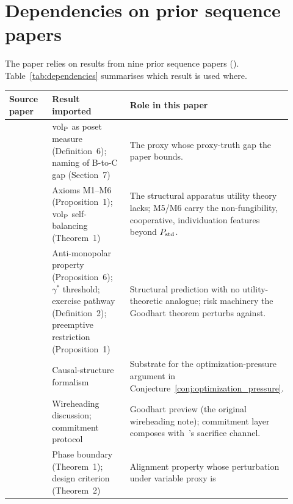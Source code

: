 \section{Dependencies on prior sequence papers}
\label{app:dependencies}

The paper relies on results from nine prior sequence papers
(\citep{lasser2026gfm,lasser2026poset,lasser2026horizon,lasser2026scm,lasser2026exo,lasser2026phase,lasser2026wamura,lasser2026paper8a,lasser2026paper8b}).
Table~\ref{tab:dependencies} summarises which result is used
where.

\begin{table}[ht]
\centering
\footnotesize
\setlength{\tabcolsep}{4pt}
\begin{tabular}{>{\raggedright\arraybackslash}p{0.18\linewidth}
                >{\raggedright\arraybackslash}p{0.32\linewidth}
                >{\raggedright\arraybackslash}p{0.42\linewidth}}
\toprule
\textbf{Source paper} & \textbf{Result imported} &
\textbf{Role in this paper} \\
\midrule
\citep[Foundation]{lasser2026gfm} &
${\operatorname{vol}_{\mathrm{P}}}$ as poset measure (Definition~6); naming of B-to-C gap
(Section~7) &
The proxy whose proxy-truth gap the paper bounds. \\
\addlinespace
\citep[Poset Definition]{lasser2026poset} &
Axioms M1--M6 (Proposition~1); ${\operatorname{vol}_{\mathrm{P}}}$ self-balancing
(Theorem~1) &
The structural apparatus utility theory lacks; M5/M6 carry the
non-fungibility, cooperative, individuation features beyond
$P_{\mathrm{std}}$. \\
\addlinespace
\citep[Horizon Aware]{lasser2026horizon} &
Anti-monopolar property (Proposition~6); $\gamma^*$ threshold;
exercise pathway (Definition~2); preemptive restriction
(Proposition~1) &
Structural prediction with no utility-theoretic analogue;
risk machinery the Goodhart theorem perturbs against. \\
\addlinespace
\citep[SCM]{lasser2026scm} &
Causal-structure formalism &
Substrate for the optimization-pressure argument in
Conjecture~\ref{conj:optimization_pressure}. \\
\addlinespace
\citep[Exogenous Verification]{lasser2026exo} &
Wireheading discussion; commitment protocol &
Goodhart preview (the original wireheading note); commitment
layer composes with~\citep{lasser2026paper8a}'s sacrifice
channel. \\
\addlinespace
\citep[Phase Redundancy]{lasser2026phase} &
Phase boundary (Theorem~1); design criterion (Theorem~2) &
Alignment property whose perturbation under variable proxy is

\end{tabular}
\end{table}
